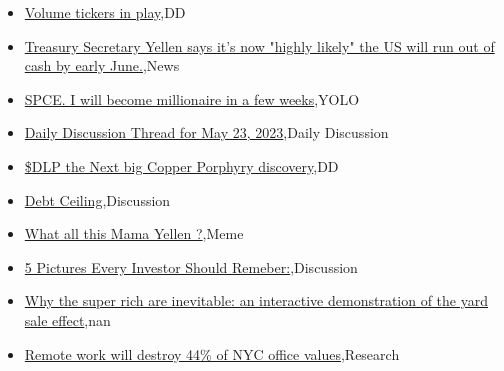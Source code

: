 \documentclass{article}%
\begin{document}
%
\begin{itemize}%
\item%
\href{https://reddit.com/r/wallstreetbets/comments/13pmsoh/volume\_tickers\_in\_play/}{Volume tickers in play},DD%
\item%
\href{https://reddit.com/r/wallstreetbets/comments/13pmimr/treasury\_secretary\_yellen\_says\_its\_now\_highly/}{Treasury Secretary Yellen says it's now "highly likely" the US will run out of cash by early June.},News%
\item%
\href{https://reddit.com/r/wallstreetbets/comments/13plg6r/spce\_i\_will\_become\_millionaire\_in\_a\_few\_weeks/}{SPCE. I will become millionaire in a few weeks},YOLO%
\item%
\href{https://reddit.com/r/wallstreetbets/comments/13pk1bl/daily\_discussion\_thread\_for\_may\_23\_2023/}{Daily Discussion Thread for May 23, 2023},Daily Discussion%
\item%
\href{https://reddit.com/r/Baystreetbets/comments/13p1m7j/dlp\_the\_next\_big\_copper\_porphyry\_discovery/}{\$DLP the Next big Copper Porphyry discovery},DD%
\item%
\href{https://reddit.com/r/StockMarket/comments/13pjb1w/debt\_ceiling/}{Debt Ceiling},Discussion%
\item%
\href{https://reddit.com/r/StockMarket/comments/13pe6en/what\_all\_this\_mama\_yellen/}{What all this Mama Yellen ?},Meme%
\item%
\href{https://reddit.com/r/StockMarket/comments/13p87lu/5\_pictures\_every\_investor\_should\_remeber/}{5 Pictures Every Investor Should Remeber:},Discussion%
\item%
\href{https://reddit.com/r/Economics/comments/13paan2/why\_the\_super\_rich\_are\_inevitable\_an\_interactive/}{Why the super rich are inevitable: an interactive demonstration of the yard sale effect},nan%
\item%
\href{https://reddit.com/r/Economics/comments/13p8jvi/remote\_work\_will\_destroy\_44\_of\_nyc\_office\_values/}{Remote work will destroy 44\% of NYC office values},Research%
\end{itemize}%
\end{document}
